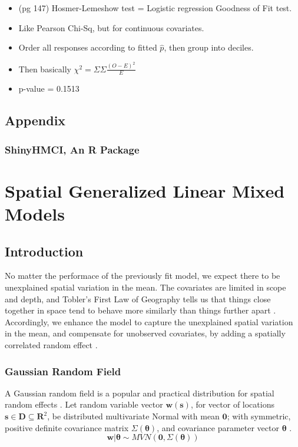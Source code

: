 \documentclass{article}
\begin{document}
  \begin{itemize} %
  \item (pg 147) Hosmer-Lemeshow test = Logistic regression Goodness of Fit test. 
  \item Like Pearson Chi-Sq, but for continuous covariates. 
  \item Order all responses according to fitted $\hat{p}$, then group into deciles. 
  \item Then basically $\chi^{2} = \Sigma \Sigma \frac{(O - E)^{2}}{E}$
  \item p-value = 0.1513
  \end{itemize}
  
\subsection{Appendix}
\subsubsection{ShinyHMCI, An R Package}


\section{Spatial Generalized Linear Mixed Models} %

\subsection{Introduction} %

No matter the performace of the previously fit model, we expect there to be unexplained spatial variation in the mean. The covariates are limited in scope and depth, and Tobler's First Law of Geography tells us that things close together in space tend to behave more similarly than things further apart \citep{Tobler1970}. Accordingly, we enhance the model to capture the unexplained spatial variation in the mean, and compensate for unobserved covariates, by adding a spatially correlated random effect  \citep{Banerjee2008}. 

\subsubsection{Gaussian Random Field} %

A Gaussian random field is a popular and practical distribution for spatial random effects \citep{Gelfand2010}. Let random variable vector $\pmb{w}(\pmb{s})$, for vector of locations $\pmb{s} \in \pmb{D} \subseteq \pmb{R}^{2}$, be distributed multivariate Normal with mean $\pmb{0}$; with symmetric, positive definite covariance matrix $\Sigma(\pmb{\theta})$, and covariance parameter vector $\pmb{\theta}$ \citep{Haran2011}.
\begin{equation}
\pmb{w} | \pmb{\theta} \sim MVN(\pmb{0}, \Sigma(\pmb{\theta})) 
\end{equation}
\end{document}
